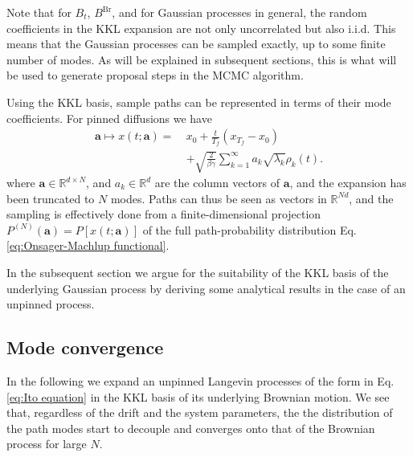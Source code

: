 Note that for $B_t$, $B^\text{Br}$, and for Gaussian processes in general, the random coefficients in the KKL expansion are not only uncorrelated but also i.i.d. This means that the Gaussian processes can be sampled exactly, up to some finite number of modes. As will be explained in subsequent sections, this is what will be used to generate proposal steps in the MCMC algorithm.

Using the KKL basis, sample paths can be represented in terms of their mode coefficients. For pinned diffusions we have
\begin{equation} \label{eq:pinned path expansion}
\begin{aligned}
\mathbf{a} \mapsto x(t;\mathbf{a}) =\ & x_0 + \frac{t}{T_f}(x_{T_f}-x_0) \\
&  + \sqrt{\frac{2}{\beta \gamma}} \sum_{k=1}^\infty a_k \sqrt{\lambda_k} \rho_k(t).
\end{aligned}
\end{equation}
where $\mathbf{a} \in \mathbb{R}^{d \times N}$, and $a_k \in \mathbb{R}^d$ are the column vectors of $\mathbf{a}$, and the expansion has been truncated to $N$ modes. Paths can thus be seen as vectors in $\mathbb{R}^{Nd}$, and the sampling is effectively done from a finite-dimensional projection $P^{(N)}(\mathbf{a}) = P[x(t;\mathbf{a})]$ of the full path-probability distribution Eq. \ref{eq:Onsager-Machlup functional}.

In the subsequent section we argue for the suitability of the KKL basis of the underlying Gaussian process by deriving some analytical results in the case of an unpinned process.

\subsection{Mode convergence}

In the following we expand an unpinned Langevin processes of the form in Eq. \ref{eq:Ito equation} in the KKL basis of its underlying Brownian motion. We see that, regardless of the drift and the system parameters, the the distribution of the path modes start to decouple and converges onto that of the Brownian process for large $N$.

